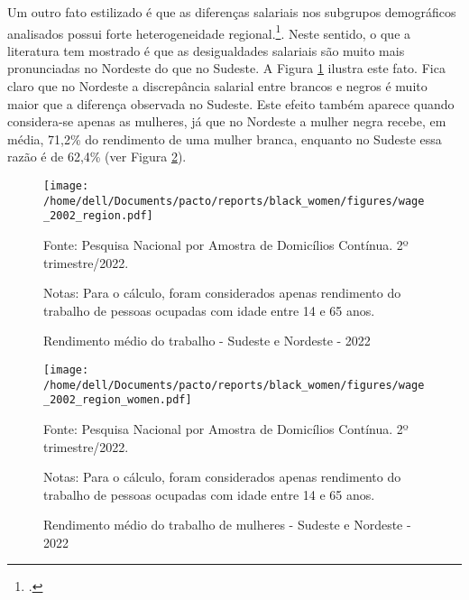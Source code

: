 \documentclass[12pt]{article}
\begin{document}
\par Um outro fato estilizado é que as diferenças salariais nos subgrupos de\-mo\-grá\-fi\-cos analisados possui forte heterogeneidade regional.\footcite{campante2004desigualdade}. Neste sentido, o que a literatura tem mostrado é que as desigualdades salariais são muito mais pronunciadas no Nordeste do que no Sudeste. A Figura \ref{fig:rendimento_regiao} ilustra este fato. Fica claro que no Nordeste a discrepância salarial entre brancos e negros é muito maior que a diferença observada no Sudeste. Este efeito também aparece quando considera-se apenas as mulheres, já que no Nordeste a mulher negra recebe, em média, 71,2\% do rendimento de uma mulher branca, enquanto no Sudeste essa razão é de 62,4\% (ver Figura \ref{fig:rendimento_regiao_sexo}).


\begin{figure}[H]
    \centering
    \caption{Rendimento médio do trabalho - Sudeste e Nordeste - 2022}
        \texttt{[image: /home/dell/Documents/pacto/reports/black\_women/figures/wage\_2002\_region.pdf]}
    \label{fig:rendimento_regiao}
    \begin{floatnotes}
        \item[Fonte:] Pesquisa Nacional por Amostra de Domicílios Contínua. 2º trimestre/2022.
        \item[Notas:] Para o cálculo, foram considerados apenas rendimento do trabalho de pessoas ocupadas com idade entre 14 e 65 anos.
    \end{floatnotes}
\end{figure}

\begin{figure}[H]
    \centering
    \caption{Rendimento médio do trabalho de mulheres - Sudeste e Nordeste - 2022}
        \texttt{[image: /home/dell/Documents/pacto/reports/black\_women/figures/wage\_2002\_region\_women.pdf]}
    \label{fig:rendimento_regiao_sexo}
    \begin{floatnotes}
        \item[Fonte:] Pesquisa Nacional por Amostra de Domicílios Contínua. 2º trimestre/2022.
        \item[Notas:] Para o cálculo, foram considerados apenas rendimento do trabalho de pessoas ocupadas com idade entre 14 e 65 anos.
    \end{floatnotes}
\end{figure}
\end{document}
